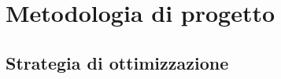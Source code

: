 \label{sec:Ottimizzazione}
\chapter{Metodologia di progetto}

\section{Strategia di ottimizzazione}
